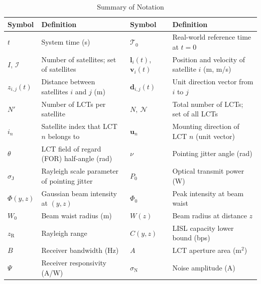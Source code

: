 \documentclass[journal]{IEEEtran}
\begin{document}
\begin{table}[t]
  \centering
  \caption{Summary of Notation}
  \label{tab:notation}
  \vspace{-0.15cm}
  \footnotesize
  \setlength{\tabcolsep}{4pt}
  \renewcommand{\arraystretch}{1.05}
  \begin{tabular}{@{}l p{} l p{}@{}}
    \hline
    \textbf{Symbol} & \textbf{Definition} & \textbf{Symbol} & \textbf{Definition} \\
    \hline
    $t$ & System time (s) & $\mathcal{T}_0$ & Real-world reference time at $t=0$ \\

    $I$, $\mathcal{I}$ & Number of satellites; set of satellites & $\mathbf{l}_i(t)$, $\mathbf{v}_i(t)$ & Position and velocity of satellite $i$ (m, m/s) \\

    $z_{i,j}(t)$ & Distance between satellites $i$ and $j$ (m) & $\mathbf{d}_{i,j}(t)$ & Unit direction vector from $i$ to $j$ \\

    $N'$ & Number of LCTs per satellite & $N,\ \mathcal{N}$ & Total number of LCTs; set of all LCTs \\

    $i_n$ & Satellite index that LCT $n$ belongs to & $\mathbf{u}_n$ & Mounting direction of LCT $n$ (unit vector) \\

    $\theta$ & LCT field of regard (FOR) half-angle (rad) & $\nu$ & Pointing jitter angle (rad) \\

    $\sigma_{\mathrm{J}}$ & Rayleigh scale parameter of pointing jitter & $P_0$ & Optical transmit power (W) \\

    $\Phi(y,z)$ & Gaussian beam intensity at $(y,z)$ & $\Phi_0$ & Peak intensity at beam waist \\

    $W_0$ & Beam waist radius (m) & $W(z)$ & Beam radius at distance $z$ \\

    $z_{\mathrm{R}}$ & Rayleigh range & $C(y,z)$ & LISL capacity lower bound (bps) \\

    $B$ & Receiver bandwidth (Hz) & $A$ & LCT aperture area (m$^2$) \\

    $\Psi$ & Receiver responsivity (A/W) & $\sigma_{\mathrm{N}}$ & Noise amplitude (A) \\


\end{tabular}
\end{table}
\end{document}
